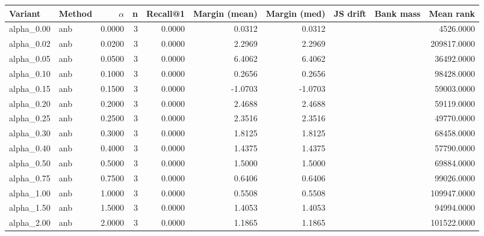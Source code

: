 \begin{tabular}{l l r r r r r r r r}
\toprule
Variant & Method & $\alpha$ & n & Recall@1 & Margin (mean) & Margin (med) & JS drift & Bank mass & Mean rank \\
\midrule
alpha\_0.00 & anb & 0.0000 & 3 & 0.0000 & 0.0312 & 0.0312 &  &  & 4526.0000 \\
alpha\_0.02 & anb & 0.0200 & 3 & 0.0000 & 2.2969 & 2.2969 &  &  & 209817.0000 \\
alpha\_0.05 & anb & 0.0500 & 3 & 0.0000 & 6.4062 & 6.4062 &  &  & 36492.0000 \\
alpha\_0.10 & anb & 0.1000 & 3 & 0.0000 & 0.2656 & 0.2656 &  &  & 98428.0000 \\
alpha\_0.15 & anb & 0.1500 & 3 & 0.0000 & -1.0703 & -1.0703 &  &  & 59003.0000 \\
alpha\_0.20 & anb & 0.2000 & 3 & 0.0000 & 2.4688 & 2.4688 &  &  & 59119.0000 \\
alpha\_0.25 & anb & 0.2500 & 3 & 0.0000 & 2.3516 & 2.3516 &  &  & 49770.0000 \\
alpha\_0.30 & anb & 0.3000 & 3 & 0.0000 & 1.8125 & 1.8125 &  &  & 68458.0000 \\
alpha\_0.40 & anb & 0.4000 & 3 & 0.0000 & 1.4375 & 1.4375 &  &  & 57790.0000 \\
alpha\_0.50 & anb & 0.5000 & 3 & 0.0000 & 1.5000 & 1.5000 &  &  & 69884.0000 \\
alpha\_0.75 & anb & 0.7500 & 3 & 0.0000 & 0.6406 & 0.6406 &  &  & 99026.0000 \\
alpha\_1.00 & anb & 1.0000 & 3 & 0.0000 & 0.5508 & 0.5508 &  &  & 109947.0000 \\
alpha\_1.50 & anb & 1.5000 & 3 & 0.0000 & 1.4053 & 1.4053 &  &  & 94994.0000 \\
alpha\_2.00 & anb & 2.0000 & 3 & 0.0000 & 1.1865 & 1.1865 &  &  & 101522.0000 \\
\bottomrule
\end{tabular}
